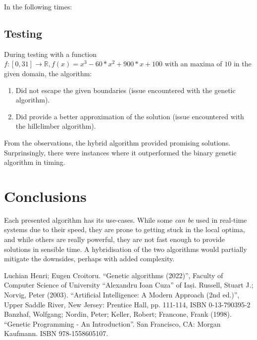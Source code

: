 \documentclass[conference]{IEEEtran}
\begin{document}


In the following times:


\subsection{Testing}
During testing with a function $f : [0, 31] \rightarrow \mathbb{R}, f(x) = x^3 - 60*x^2 + 900*x + 100$ with an maxima of $10$ in the given domain, the algorithm:
\begin{enumerate}
    \item Did not escape the given boundaries (issue encountered with the genetic algorithm).
    \item Did provide a better approximation of the solution (issue encountered with the hillclimber algorithm).
\end{enumerate}

From the observations, the hybrid algorithm provided promising solutions. Surprinsingly, there were instances
where it outperformed the binary genetic algorithm in timing.

\section{Conclusions}
Each presented algorithm has its use-cases. While some \textit{can be} used in real-time systems due to their speed,
they are prone to getting stuck in the local optima, and while others are really powerful, they are not fast enough
to provide solutions in sensible time. A hybridisation of the two algorithms would partially mitigate the downsides, perhaps
with added complexity.

\begin{thebibliography}{00}
 Luchian Henri; Eugen Croitoru. ``Genetic algorithms (2022)'', Faculty of Computer Science of University ``Alexandru Ioan Cuza'' of Iași.
 Russell, Stuart J.; Norvig, Peter (2003). ``Artificial Intelligence: A Modern Approach (2nd ed.)'', Upper Saddle River, New Jersey: Prentice Hall, pp. 111-114, ISBN 0-13-790395-2 
 Banzhaf, Wolfgang; Nordin, Peter; Keller, Robert; Francone, Frank (1998). ``Genetic Programming - An Introduction''. San Francisco, CA: Morgan Kaufmann. ISBN 978-1558605107.
\end{thebibliography}
\end{document}
